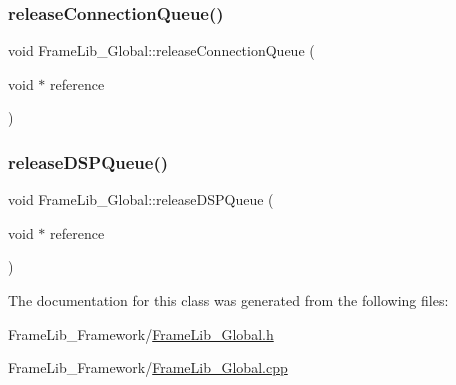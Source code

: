 \mbox{\label{class_frame_lib___global_ab461ad3b4bdd9c580018373cf1617b1b}} 
\subsubsection{\texorpdfstring{release\+Connection\+Queue()}{releaseConnectionQueue()}}
{\footnotesize\ttfamily void Frame\+Lib\+\_\+\+Global\+::release\+Connection\+Queue (\begin{DoxyParamCaption}\item[{void $\ast$}]{reference }\end{DoxyParamCaption})}

\mbox{\label{class_frame_lib___global_a118b451294a2893fa60edfb09f60002a}} 
\subsubsection{\texorpdfstring{release\+D\+S\+P\+Queue()}{releaseDSPQueue()}}
{\footnotesize\ttfamily void Frame\+Lib\+\_\+\+Global\+::release\+D\+S\+P\+Queue (\begin{DoxyParamCaption}\item[{void $\ast$}]{reference }\end{DoxyParamCaption})}



The documentation for this class was generated from the following files\+:\begin{DoxyCompactItemize}
\item 
Frame\+Lib\+\_\+\+Framework/\hyperlink{_frame_lib___global_8h}{Frame\+Lib\+\_\+\+Global.\+h}\item 
Frame\+Lib\+\_\+\+Framework/\hyperlink{_frame_lib___global_8cpp}{Frame\+Lib\+\_\+\+Global.\+cpp}\end{DoxyCompactItemize}
